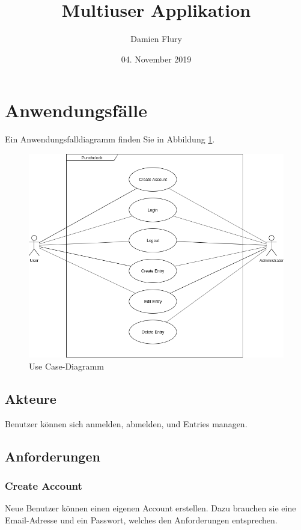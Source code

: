 \documentclass[a4paper, titlepage]{article}
\title{Multiuser Applikation}
\author{Damien Flury}
\date{04. November 2019}
\begin{document}
    \maketitle

    \tableofcontents
    \newpage

    \section{Anwendungsfälle}
    Ein Anwendungsfalldiagramm finden Sie in Abbildung \ref{usecase}.

    \begin{figure}
        \includegraphics[width=\textwidth]{images/UseCaseDiagram.png}
        \caption{Use Case-Diagramm}
        \label{usecase}
    \end{figure}
    \subsection{Akteure}
    Benutzer können sich anmelden, abmelden, und Entries managen.

    \subsection{Anforderungen}
    \subsubsection{Create Account}
    Neue Benutzer können einen eigenen Account erstellen. Dazu
    brauchen sie eine Email-Adresse und ein Passwort, welches
    den Anforderungen entsprechen.
\end{document}
